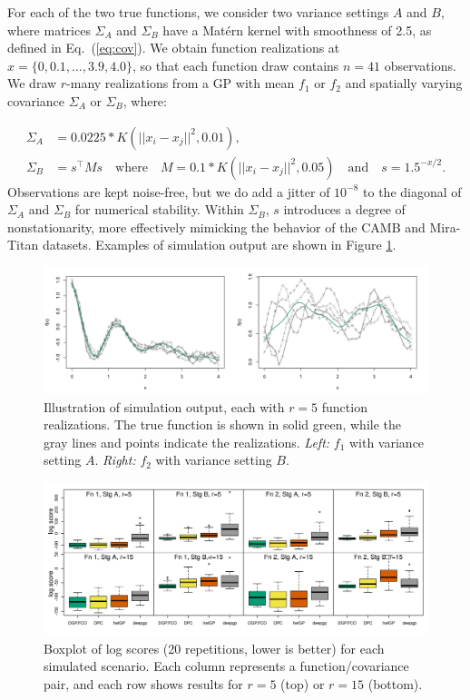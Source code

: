 \documentclass[11pt]{article}
\begin{document}
For each of the two true functions, we consider two variance settings $A$ and $B$, where 
matrices $\Sigma_A$ and $\Sigma_B$ have a Mat\'ern kernel with smoothness of 2.5,
as defined in Eq.~(\ref{eq:cov}). 
We obtain function realizations at $x=\{0, 0.1, \dots, 
3.9, 4.0\}$, so that each function draw contains $n=41$ observations. We draw $r$-many 
realizations from a GP with mean $f_1$ or $f_2$ and spatially varying covariance
$\Sigma_A$ or $\Sigma_B$, where:  

\[
\begin{aligned}
\Sigma_A &= 0.0225 * K(||x_i - x_j||^2, 0.01), \\
\Sigma_B &= s^\top Ms \quad\textrm{where}\quad M = 0.1 * K(||x_i - x_j||^2, 0.05)
\quad\textrm{and}\quad s = 1.5^{-x/2}.
\end{aligned}
\]
Observations are kept noise-free, but we do add a jitter of $10^{-8}$ to the diagonal of $\Sigma_A$ 
and $\Sigma_B$ for numerical stability.  Within $\Sigma_B$, $s$ introduces a degree of
nonstationarity, more effectively mimicking the behavior of the 
CAMB and Mira-Titan datasets.  Examples of simulation output are shown in 
Figure \ref{fig:run_sim_f1A_f2B}.

\begin{figure}
    \centering
    \includegraphics[width=\textwidth]{run_sim_f1A_f2B.png}
    \caption{Illustration of simulation output, each with $r=5$ function realizations. The true function
             is shown in solid green, while the gray lines and points indicate the realizations. 
             {\it Left:} $f_1$ with variance setting $A$. 
             {\it Right:} $f_2$ with variance setting $B$.}   
    \label{fig:run_sim_f1A_f2B}
\end{figure}

\begin{figure}[t]
    \centering
    \includegraphics[width=\textwidth]{sims_logS.jpeg}
    \caption{Boxplot of log scores (20 repetitions, lower is better) for each 
             simulated scenario.  Each column represents a function/covariance 
             pair, and each row shows results for $r=5$ (top) or $r=15$ (bottom).}
    \label{fig:sims_logS}
\end{figure}
\end{document}
